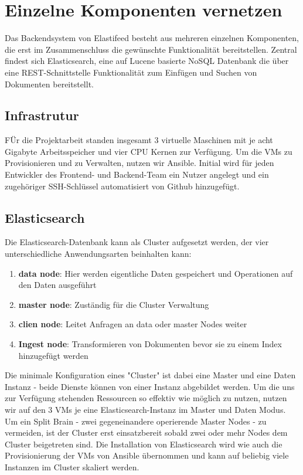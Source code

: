 \section{Einzelne Komponenten vernetzen}

Das Backendsystem von Elastifeed besteht aus mehreren einzelnen Komponenten, die erst im Zusammenschluss die gewünschte Funktionalität bereitstellen.
Zentral findest sich Elasticsearch, eine auf Lucene basierte NoSQL Datenbank die über eine REST-Schnittstelle Funktionalität zum Einfügen und Suchen von Dokumenten bereitstellt.


\subsection{Infrastrutur}
FÜr die Projektarbeit standen insgesamt 3 virtuelle Maschinen mit je acht Gigabyte Arbeitsspeicher und vier CPU Kernen zur Verfügung.
Um die VMs zu Provisionieren und zu Verwalten, nutzen wir Ansible.
Initial wird für jeden Entwickler des Frontend- und Backend-Team ein Nutzer angelegt und ein zugehöriger SSH-Schlüssel automatisiert von Github hinzugefügt.
\endsubsection

\subsection{Elasticsearch}
Die Elasticsearch-Datenbank kann als Cluster aufgesetzt werden, der vier unterschiedliche Anwendungsarten beinhalten kann:
\begin{enumerate}
        \item \textbf{data node}: Hier werden eigentliche Daten gespeichert und Operationen auf den Daten ausgeführt
        \item \textbf{master node}: Zuständig für die Cluster Verwaltung
        \item \textbf{clien node}: Leitet Anfragen an data oder master Nodes weiter
        \item \textbf{Ingest node}: Transformieren von Dokumenten bevor sie zu einem Index hinzugefügt werden
\end{enumerate}
Die minimale Konfiguration eines "Cluster" ist dabei eine Master und eine Daten Instanz - beide Dienste können von einer Instanz abgebildet werden.
Um die uns zur Verfügung stehenden Ressourcen so effektiv wie möglich zu nutzen, nutzen wir auf den 3 VMs je eine Elasticsearch-Instanz im Master und Daten Modus.
Um ein Split Brain - zwei gegeneinandere operierende Master Nodes - zu vermeiden, ist der Cluster erst einsatzbereit sobald zwei oder mehr Nodes dem Cluster beigetreten sind.
Die Installation von Elasticsearch wird wie auch die Provisionierung der VMs von Ansible übernommen und kann auf beliebig viele Instanzen im Cluster skaliert werden.

